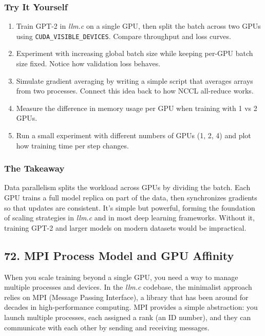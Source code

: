 \documentclass[
  letterpaper,
  DIV=11,
  numbers=noendperiod]{scrreprt}
\providecommand{\tightlist}{%
  \setlength{\itemsep}{0pt}\setlength{\parskip}{0pt}}
\begin{document}
\subsubsection{Try It Yourself}\label{try-it-yourself-59}

\begin{enumerate}
\def\labelenumi{\arabic{enumi}.}
\tightlist
\item
  Train GPT-2 in \emph{llm.c} on a single GPU, then split the batch
  across two GPUs using \texttt{CUDA\_VISIBLE\_DEVICES}. Compare
  throughput and loss curves.
\item
  Experiment with increasing global batch size while keeping per-GPU
  batch size fixed. Notice how validation loss behaves.
\item
  Simulate gradient averaging by writing a simple script that averages
  arrays from two processes. Connect this idea back to how NCCL
  all-reduce works.
\item
  Measure the difference in memory usage per GPU when training with 1 vs
  2 GPUs.
\item
  Run a small experiment with different numbers of GPUs (1, 2, 4) and
  plot how training time per step changes.
\end{enumerate}

\subsubsection{The Takeaway}\label{the-takeaway-60}

Data parallelism splits the workload across GPUs by dividing the batch.
Each GPU trains a full model replica on part of the data, then
synchronizes gradients so that updates are consistent. It's simple but
powerful, forming the foundation of scaling strategies in \emph{llm.c}
and in most deep learning frameworks. Without it, training GPT-2 and
larger models on modern datasets would be impractical.

\subsection{72. MPI Process Model and GPU
Affinity}\label{mpi-process-model-and-gpu-affinity}

When you scale training beyond a single GPU, you need a way to manage
multiple processes and devices. In the \emph{llm.c} codebase, the
minimalist approach relies on MPI (Message Passing Interface), a library
that has been around for decades in high-performance computing. MPI
provides a simple abstraction: you launch multiple processes, each
assigned a rank (an ID number), and they can communicate with each other
by sending and receiving messages.
\end{document}
